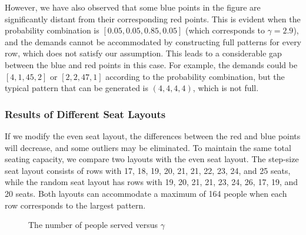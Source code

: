 However, we have also observed that some blue points in the figure are significantly distant from their corresponding red points. This is evident when the probability combination is $[0.05, 0.05, 0.85, 0.05]$ (which corresponds to $\gamma = 2.9$), and the demands cannot be accommodated by constructing full patterns for every row, which does not satisfy our assumption. This leads to a considerable gap between the blue and red points in this case. For example, the demands could be $[4, 1, 45, 2]$ or $[2, 2, 47, 1]$ according to the probability combination, but the typical pattern that can be generated is $(4,4,4,4)$, which is not full.

\subsubsection{Results of Different Seat Layouts}
If we modify the even seat layout, the differences between the red and blue points will decrease, and some outliers may be eliminated. To maintain the same total seating capacity, we compare two layouts with the even seat layout. The step-size seat layout consists of rows with 17, 18, 19, 20, 21, 21, 22, 23, 24, and 25 seats, while the random seat layout has rows with 19, 20, 21, 21, 23, 24, 26, 17, 19, and 20 seats. Both layouts can accommodate a maximum of 164 people when each row corresponds to the largest pattern.

\begin{figure}[ht]
  \centering
  \caption{The number of people served versus $\gamma$}
\end{figure}

